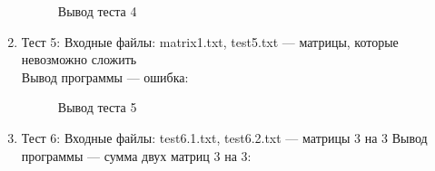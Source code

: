 \documentclass[12pt, a4paper]{article}
\begin{document}
\begin{enumerate}
\begin{figure}[h]
  		\caption{Вывод теста 4}
	\end{figure}
	\newpage
	\item Тест 5: Входные файлы: matrix1.txt, 
	test5.txt --- матрицы, которые невозможно сложить\\
	Вывод программы --- ошибка:
	\begin{figure}[h]
  		\caption{Вывод теста 5}
	\end{figure}
	\newpage
	\item Тест 6: Входные файлы: test6.1.txt, 
	test6.2.txt --- матрицы 3 на 3
	Вывод программы --- сумма двух матриц 3 на 3:
	\begin{figure}[h]

\end{figure}
\end{enumerate}
\end{document}
